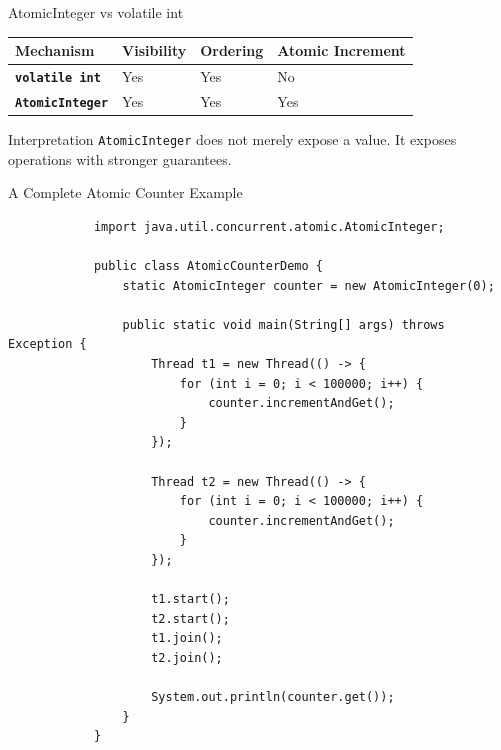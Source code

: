 \documentclass[aspectratio=169,11pt]{beamer}
\begin{document}
	\begin{frame}{AtomicInteger vs volatile int}
		\centering
		\begin{tabular}{>{\bfseries}m{3.2cm} >{\centering\arraybackslash}m{2cm} >{\centering\arraybackslash}m{2cm} >{\centering\arraybackslash}m{2cm}}
			\toprule
			Mechanism & Visibility & Ordering & Atomic Increment \\
			\midrule
			\texttt{volatile int} & Yes & Yes & No \\
			\texttt{AtomicInteger} & Yes & Yes & Yes \\
			\bottomrule
		\end{tabular}
		
		\vspace{0.4cm}
		
		\begin{exampleblock}{Interpretation}
			\texttt{AtomicInteger} does not merely expose a value.  
			It exposes operations with stronger guarantees.
		\end{exampleblock}
	\end{frame}
	
	\begin{frame}[fragile]{A Complete Atomic Counter Example}
		\begin{lstlisting}
			import java.util.concurrent.atomic.AtomicInteger;
			
			public class AtomicCounterDemo {
				static AtomicInteger counter = new AtomicInteger(0);
				
				public static void main(String[] args) throws Exception {
					Thread t1 = new Thread(() -> {
						for (int i = 0; i < 100000; i++) {
							counter.incrementAndGet();
						}
					});
					
					Thread t2 = new Thread(() -> {
						for (int i = 0; i < 100000; i++) {
							counter.incrementAndGet();
						}
					});
					
					t1.start();
					t2.start();
					t1.join();
					t2.join();
					
					System.out.println(counter.get());
				}
			}
		\end{lstlisting}
	\end{frame}
	
\end{document}
